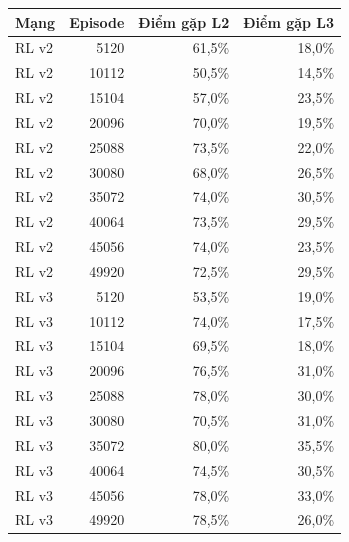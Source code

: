 \begin{center}\small
\begin{tabular}{@{}lrrr@{}}
\toprule
Mạng & Episode & Điểm gặp L2 & Điểm gặp L3 \\
\midrule
RL v2 & 5120 & 61,5\% & 18,0\% \\
RL v2 & 10112 & 50,5\% & 14,5\% \\
RL v2 & 15104 & 57,0\% & 23,5\% \\
RL v2 & 20096 & 70,0\% & 19,5\% \\
RL v2 & 25088 & 73,5\% & 22,0\% \\
RL v2 & 30080 & 68,0\% & 26,5\% \\
RL v2 & 35072 & 74,0\% & 30,5\% \\
RL v2 & 40064 & 73,5\% & 29,5\% \\
RL v2 & 45056 & 74,0\% & 23,5\% \\
RL v2 & 49920 & 72,5\% & 29,5\% \\
RL v3 & 5120 & 53,5\% & 19,0\% \\
RL v3 & 10112 & 74,0\% & 17,5\% \\
RL v3 & 15104 & 69,5\% & 18,0\% \\
RL v3 & 20096 & 76,5\% & 31,0\% \\
RL v3 & 25088 & 78,0\% & 30,0\% \\
RL v3 & 30080 & 70,5\% & 31,0\% \\
RL v3 & 35072 & 80,0\% & 35,5\% \\
RL v3 & 40064 & 74,5\% & 30,5\% \\
RL v3 & 45056 & 78,0\% & 33,0\% \\
RL v3 & 49920 & 78,5\% & 26,0\% \\
\bottomrule
\end{tabular}
\end{center}